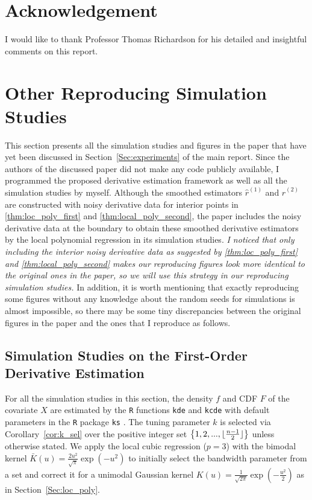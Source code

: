 \documentclass{uwstat572}
\theoremstyle{definition}
\DeclarePairedDelimiter\floor{\lfloor}{\rfloor}
\renewcommand{\hat}{\widehat}
\theoremstyle{theorem}
\begin{document}
\pagebreak

\section*{Acknowledgement}

I would like to thank Professor Thomas Richardson for his detailed and insightful comments on this report.



\appendix

\section{Other Reproducing Simulation Studies}
\label{App:repro}

This section presents all the simulation studies and figures in the paper \citep{liu2020smoothed} that have yet been discussed in Section~\ref{Sec:experiments} of the main report. Since the authors of the discussed paper did not make any code publicly available, I programmed the proposed derivative estimation framework as well as all the simulation studies by myself. Although the smoothed estimators $\hat{r}^{(1)}$ and $\hat{r}^{(2)}$ are constructed with noisy derivative data for interior points in \autoref{thm:loc_poly_first} and \autoref{thm:local_poly_second}, the paper includes the noisy derivative data at the boundary to obtain these smoothed derivative estimators by the local polynomial regression in its simulation studies. \emph{I noticed that only including the interior noisy derivative data as suggested by \autoref{thm:loc_poly_first} and \autoref{thm:local_poly_second} makes our reproducing figures look more identical to the original ones in the paper, so we will use this strategy in our reproducing simulation studies.} In addition, it is worth mentioning that exactly reproducing some figures without any knowledge about the random seeds for simulations is almost impossible, so there may be some tiny discrepancies between the original figures in the paper and the ones that I reproduce as follows.

\subsection{Simulation Studies on the First-Order Derivative Estimation}

For all the simulation studies in this section, the density $f$ and CDF $F$ of the covariate $X$ are estimated by the \texttt{R} functions \texttt{kde} and \texttt{kcde} with default parameters in the \texttt{R} package \texttt{ks} \citep{ks2022R}. The tuning parameter $k$ is selected via Corollary~\ref{cor:k_sel} over the positive integer set $\left\{1,2,...,\floor{\frac{n-1}{2}}\right\}$ unless otherwise stated. We apply the local cubic regression ($p=3$) with the bimodal kernel $\bar{K}(u)=\frac{2u^2}{\sqrt{\pi}} \exp\left(-u^2\right)$ to initially select the bandwidth parameter from a set and correct it for a unimodal Gaussian kernel $K(u)=\frac{1}{\sqrt{2\pi}} \exp\left(-\frac{u^2}{2}\right)$ as in Section~\ref{Sec:loc_poly}.
\end{document}
